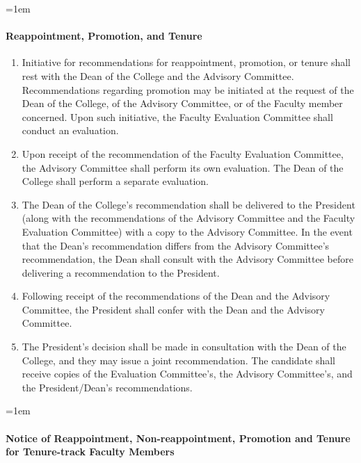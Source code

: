 \documentclass{manual}
\let\oldparagraph\paragraph
\renewcommand\paragraph{\leftskip=1em\oldparagraph}
\newcommand{\itemLevelA}{\alph*.}
\newcommand{\itemRefA}{\alph*}
\begin{document}
\paragraph{Reappointment, Promotion, and Tenure}

	\begin{enumerate}[label=\itemLevelA,ref=\itemRefA]
	\item Initiative for recommendations for reappointment, promotion, or tenure shall rest with the Dean of the College and the Advisory Committee. Recommendations regarding promotion may be initiated at the request of the Dean of the College, of the Advisory Committee, or of the Faculty member concerned. Upon such initiative, the Faculty Evaluation Committee shall conduct an evaluation.
	\item Upon receipt of the recommendation of the Faculty Evaluation Committee, the Advisory Committee shall perform its own evaluation. The Dean of the College shall perform a separate evaluation.
	\item The Dean of the College's recommendation shall be delivered to the President (along with the recommendations of the Advisory Committee and the Faculty Evaluation Committee) with a copy to the Advisory Committee. In the event that the Dean's recommendation differs from the Advisory Committee's recommendation, the Dean shall consult with the Advisory Committee before delivering a recommendation to the President.
	\item Following receipt of the recommendations of the Dean and the Advisory Committee, the President shall confer with the Dean and the Advisory Committee.
	\item The President's decision shall be made in consultation with the Dean of the College, and they may issue a joint recommendation. The candidate shall receive copies of the Evaluation Committee's, the Advisory Committee's, and the President/Dean's recommendations.
	\end{enumerate}

\paragraph{Notice of Reappointment, Non-reappointment, Promotion and Tenure for Tenure-track Faculty Members}
\end{document}
